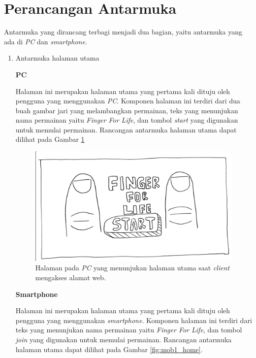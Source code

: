 \section{Perancangan Antarmuka}
\label{sec:antarmuka}

Antarmuka yang dirancang terbagi menjadi dua bagian, yaitu antarmuka yang ada di \textit{PC} dan \textit{smartphone}.

\begin{enumerate}
	\item Antarmuka halaman utama
	
	\textbf{PC}
	
	Halaman ini merupakan halaman utama yang pertama kali dituju oleh pengguna yang menggunakan \textit{PC}. Komponen halaman ini terdiri dari dua buah gambar jari yang melambangkan permainan, teks yang menunjukan nama permainan yaitu \textit{Finger For Life}, dan tombol \textit{start} yang digunakan untuk memulai permainan. Rancangan antarmuka halaman utama dapat dilihat pada Gambar \ref{fig:web1_home}

\begin{figure}[H]
	\centering
	\includegraphics[scale=0.1]{Gambar/web1_home}
	\caption{Halaman pada \textit{PC} yang menunjukan halaman utama saat \textit{client} mengakses alamat web.}
	\label{fig:web1_home}
\end{figure}

	\textbf{Smartphone}
	
	Halaman ini merupakan halaman utama yang pertama kali dituju oleh pengguna yang menggunakan \textit{smartphone}. Komponen halaman ini terdiri dari teks yang menunjukan nama permainan yaitu \textit{Finger For Life}, dan tombol \textit{join} yang digunakan untuk memulai permainan. Rancangan antarmuka halaman utama dapat dilihat pada Gambar \ref{fig:mob1_home}.
	

\end{enumerate}

